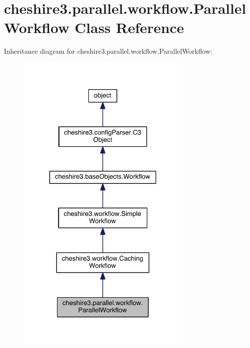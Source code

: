 \hypertarget{classcheshire3_1_1parallel_1_1workflow_1_1_parallel_workflow}{\section{cheshire3.\-parallel.\-workflow.\-Parallel\-Workflow Class Reference}
\label{classcheshire3_1_1parallel_1_1workflow_1_1_parallel_workflow}
}


Inheritance diagram for cheshire3.\-parallel.\-workflow.\-Parallel\-Workflow\-:
\nopagebreak
\begin{figure}[H]
\begin{center}
\leavevmode
\includegraphics[width=242pt]{classcheshire3_1_1parallel_1_1workflow_1_1_parallel_workflow__inherit__graph}
\end{center}
\end{figure}


